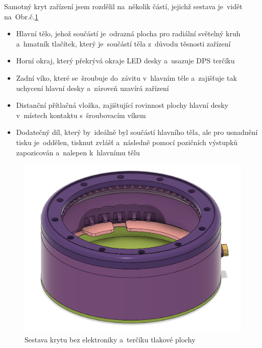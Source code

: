 Samotný kryt zařízení jsem rozdělil na~několik částí, jejichž sestava je~vidět na~Obr.č.\ref{fig:AHS-kryt}
\begin{itemize}
    \item Hlavní tělo, jehož součástí je~odrazná plocha pro radiální světelný kruh a~hmatník tlačítek, který je~součástí těla z~důvodu těsnosti zařízení
    \item Horní okraj, který překrývá okraje LED desky a~usazuje DPS terčíku
    \item Zadní víko, které se~šroubuje do~závitu v~hlavním těle a~zajišťuje tak uchycení hlavní desky a~zároveň uzavírá zařízení
    \item Distanční přítlačná vložka, zajištující rovinnost plochy hlavní desky v~místech kontaktu s~šroubovacím víkem
    \item Dodatečný díl, který by~ideálně byl součástí hlavního těla, ale pro usnadnění tisku je~oddělen, tisknut zvlášť a~následně pomocí pozičních výstupků zapozicován a~nalepen k~hlavnímu tělu  ~
\end{itemize}

\begin{figure}[h!]
    \centering
    \includegraphics[width=\textwidth]{text/PraktickaCast/img/Kryt-Lucerny.png}
    \caption{Sestava krytu bez elektroniky a~terčíku tlakové plochy}
    \label{fig:AHS-kryt}
\end{figure}
